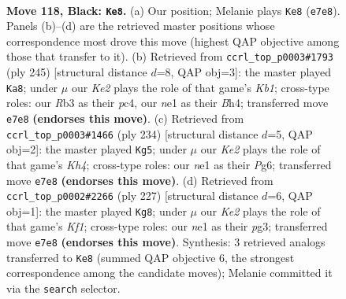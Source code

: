 \documentclass[11pt]{article}
\begin{document}
\clearpage

\begin{figure}[p]\centering
\begin{subfigure}{0.46\textwidth}\centering
\resizebox{\linewidth}{!}{%
\newchessgame
\chessboard[
  setfen={8/4k3/8/6K1/6P1/1r6/3R4/4N3 b - - 20 118},
  showmover=false,
  pgfstyle=straightmove, color=movearrow, markmove={e7-e8}
]}
\caption{}
\end{subfigure}\hfill
\begin{subfigure}{0.46\textwidth}\centering
\resizebox{\linewidth}{!}{%
\newchessgame
\chessboard[
  setfen={1k6/8/K7/P7/2P4b/7B/8/8 b - - 8 123},
  showmover=false,
  pgfstyle=straightmove, color=movearrow, markmove={b8-a8}
]}
\caption{}
\end{subfigure}
\\[4pt]
\begin{subfigure}{0.46\textwidth}\centering
\resizebox{\linewidth}{!}{%
\newchessgame
\chessboard[
  setfen={8/5R2/4p1P1/4k3/7K/8/8/2r5 w - - 0 118},
  showmover=false,
  pgfstyle=straightmove, color=movearrow, markmove={h4-g5}
]}
\caption{}
\end{subfigure}\hfill
\begin{subfigure}{0.46\textwidth}\centering
\resizebox{\linewidth}{!}{%
\newchessgame
\chessboard[
  setfen={5k2/2R5/r7/6PK/8/6P1/8/8 b - - 24 114},
  showmover=false,
  pgfstyle=straightmove, color=movearrow, markmove={f8-g8}
]}
\caption{}
\end{subfigure}
\caption{\textbf{Move 118, Black: \texttt{Ke8}.} (a) Our position; Melanie plays \texttt{Ke8} (\texttt{e7e8}). Panels (b)--(d) are the retrieved master positions whose correspondence most drove this move (highest QAP objective among those that transfer to it). (b) Retrieved from \texttt{ccrl\_top\_p0003\#1793} (ply 245) [structural distance $d$=8, QAP obj=3]: the master played \texttt{Ka8}; under $\mu$ our \emph{Ke2} plays the role of that game's \emph{Kb1}; cross-type roles: our \emph{R}b3 as their \emph{p}c4, our \emph{n}e1 as their \emph{B}h4; transferred move \texttt{e7e8} \textbf{(endorses this move)}. (c) Retrieved from \texttt{ccrl\_top\_p0003\#1466} (ply 234) [structural distance $d$=5, QAP obj=2]: the master played \texttt{Kg5}; under $\mu$ our \emph{Ke2} plays the role of that game's \emph{Kh4}; cross-type roles: our \emph{n}e1 as their \emph{P}g6; transferred move \texttt{e7e8} \textbf{(endorses this move)}. (d) Retrieved from \texttt{ccrl\_top\_p0002\#2266} (ply 227) [structural distance $d$=6, QAP obj=1]: the master played \texttt{Kg8}; under $\mu$ our \emph{Ke2} plays the role of that game's \emph{Kf1}; cross-type roles: our \emph{n}e1 as their \emph{p}g3; transferred move \texttt{e7e8} \textbf{(endorses this move)}. Synthesis: 3 retrieved analogs transferred to \texttt{Ke8} (summed QAP objective 6, the strongest correspondence among the candidate moves); Melanie committed it via the \texttt{search} selector.}
\label{fig:thought-m235}
\end{figure}
\end{document}
